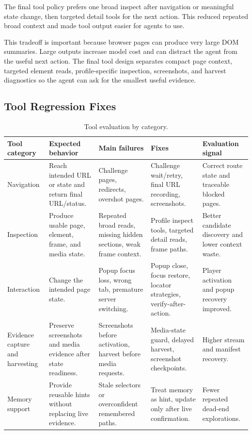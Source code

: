 The final tool policy prefers one broad inspect after navigation or meaningful
state change, then targeted detail tools for the next action. This reduced
repeated broad context and made tool output easier for agents to use.

This tradeoff is important because browser pages can produce very large DOM
summaries. Large outputs increase model cost and can distract the agent from
the useful next action. The final tool design separates compact page context,
targeted element reads, profile-specific inspection, screenshots, and harvest
diagnostics so the agent can ask for the smallest useful evidence.

\subsection{Tool Regression Fixes}

\begin{table}[!htbp]
\centering
\begin{tabularx}{\textwidth}{Q{2.7cm} Y Y Y Y}
\toprule
{}
Tool category & Expected behavior & Main failures & Fixes & Evaluation signal \\
\midrule
Navigation & Reach intended URL or state and return final URL/status. &
Challenge pages, redirects, overshot pages. & Challenge wait/retry, final URL
recording, screenshots. & Correct route state and traceable blocked pages. \\
Inspection & Produce usable page, element, frame, and media state. & Repeated
broad reads, missing hidden sections, weak frame context. & Profile inspect
tools, targeted detail reads, frame paths. & Better candidate discovery and
lower context waste. \\
Interaction & Change the intended page state. & Popup focus loss, wrong tab,
premature server switching. & Popup close, focus restore, locator strategies,
verify-after-action. & Player activation and popup recovery improved. \\
Evidence capture and harvesting & Preserve screenshots and media evidence after
state readiness. & Screenshots before activation, harvest before media
requests. & Media-state guard, delayed harvest, screenshot checkpoints. &
Higher stream and manifest recovery. \\
Memory support & Provide reusable hints without replacing live evidence. &
Stale selectors or overconfident remembered paths. & Treat memory as hint,
update only after live confirmation. & Fewer repeated dead-end explorations. \\
\bottomrule
\end{tabularx}
\caption{Tool evaluation by category.}
\label{tab:tool-evaluation-by-category}
\end{table}

